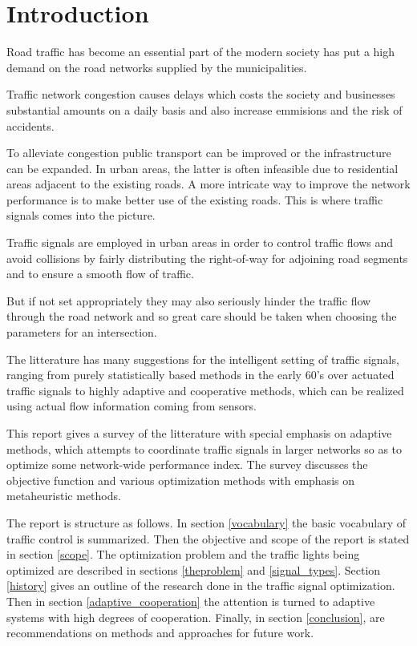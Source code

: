 \section{Introduction}
Road traffic has become an essential part of the modern society has put a high demand on the road networks supplied by the municipalities. 

Traffic network congestion causes delays which costs the society and businesses substantial amounts on a daily basis and also increase emmisions and the risk of accidents.

To alleviate congestion public transport can be improved or the infrastructure can be expanded. In urban areas, the latter is often infeasible due to residential areas adjacent to the existing roads. 
A more intricate way to improve the network performance is to make better use of the existing roads. This is where traffic signals comes into the picture. 

Traffic signals are employed in urban areas in order to control traffic flows and avoid collisions by fairly distributing the right-of-way for adjoining road segments and to ensure a smooth flow of traffic.

But if not set appropriately they may also seriously hinder the traffic flow through the road network and so great care should be taken when choosing the parameters for an intersection. 

The litterature has many suggestions for the intelligent setting of traffic signals, ranging from purely statistically based methods in the early 60's over actuated traffic signals to highly adaptive and cooperative methods, which can be realized using actual flow information coming from sensors. 

This report gives a survey of the litterature with special emphasis on adaptive methods, which attempts to coordinate traffic signals in larger networks so as to optimize some network-wide performance index. The survey discusses the objective function and various optimization methods with emphasis on metaheuristic methods.

The report is structure as follows. In section \ref{vocabulary} the basic vocabulary of traffic control is summarized. Then the objective and scope of the report is stated in section \ref{scope}. 
The optimization problem and the traffic lights being optimized are described in sections \ref{theproblem} and \ref{signal_types}.
Section \ref{history} gives an outline of the research done in the traffic signal optimization. Then in section \ref{adaptive_cooperation} the attention is turned to adaptive systems with high degrees of cooperation.
Finally, in section \ref{conclusion}, are recommendations on methods and approaches for future work.
